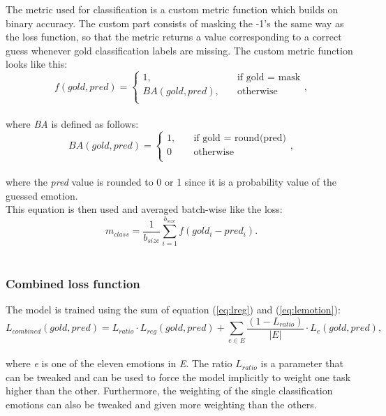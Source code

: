 The metric used for classification is a custom metric function which builds on binary accuracy. The custom part consists of masking the -1's the same way as the loss function, so that the metric returns a value corresponding to a correct guess whenever gold classification labels are missing. The custom metric function looks like this: \\
\begin{equation}
f(gold,pred) =
     \begin{cases}
       1, &\quad\text{if gold = mask}\\
       BA(gold,pred), &\quad\text{otherwise} \\
     \end{cases},
\end{equation}\\
where \textit{BA} is defined as follows: \\
\begin{equation} \label{eq:bin_acc}
BA(gold, pred) =
	\begin{cases}
		1, &\quad\text{if gold = round(pred)} \\
		0 &\quad\text{otherwise} \\
	\end{cases},
\end{equation}\\
where the \textit{pred} value is rounded to 0 or 1 since it is a probability value of the guessed emotion.\\
This equation is then used and averaged batch-wise like the loss: \\
\begin{equation} \label{eq:class_metric}
m_{class}=\dfrac{1}{b_{size}}\sum^{b_{size}}_{i=1}f\left(gold_{i}-pred_{i}\right).
\end{equation}\\

\subsubsection{Combined loss function}
The model is trained using the sum of equation (\ref{eq:lreg}) and (\ref{eq:lemotion}):\\
\begin{equation} \label{eq:lratio}
L_{combined}(gold,pred)=L_{ratio}\cdot L_{reg}(gold, pred) +  \sum_{e\in E}\dfrac{(1-L_{ratio})}{|E|}\cdot L_{e}(gold, pred),
\end{equation}\\
where \textit{e} is one of the eleven emotions in \textit{E}. The ratio $L_{ratio}$ is a parameter that can be tweaked and can be used to force the model implicitly to weight one task higher than the other. Furthermore, the weighting of the single classification emotions can also be tweaked and given more weighting than the others.

